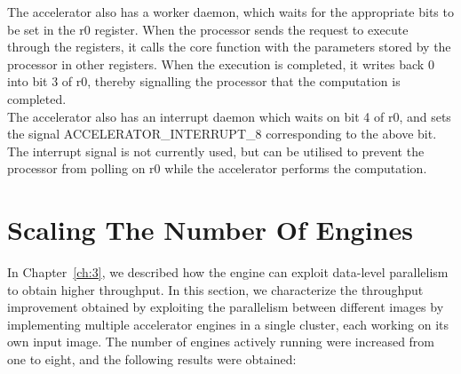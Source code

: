 \documentclass[a4paper,12pt, final]{report}
\begin{document}
The accelerator also has a worker daemon, which waits for the appropriate bits to be set in the r0 register. When the processor sends the request to execute through the registers, it calls the core function with the parameters stored by the processor in other registers. When the execution is completed, it writes back 0 into bit 3 of r0, thereby signalling the processor that the computation is completed.
\\

The accelerator also has an interrupt daemon which waits on bit 4 of r0, and sets the signal ACCELERATOR\_INTERRUPT\_8 corresponding to the above bit. The interrupt signal is not currently used, but can be utilised to prevent the processor from polling on r0 while the accelerator performs the computation.
\\


\section{Scaling The Number Of Engines}\label{sec:scale_eng}

In Chapter~\ref{ch:3}, we described how the engine can exploit data-level parallelism to obtain higher throughput. In this section, we characterize the throughput improvement obtained by exploiting the parallelism between different images by implementing multiple accelerator engines in a single cluster, each working on its own input image. The number of engines actively running were increased from one to eight, and the following results were obtained:
\\
\end{document}
